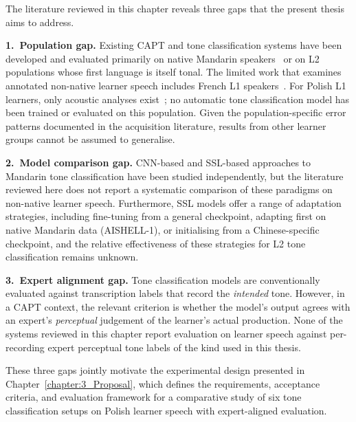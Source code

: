 The literature reviewed in this chapter reveals three gaps that the present thesis aims to address.

\textbf{1.~Population gap.} Existing CAPT and tone classification systems have been developed and evaluated primarily on native Mandarin speakers~\cite{chen2016cnn,gao2019tonenet} or on L2 populations whose first language is itself tonal. The limited work that examines annotated non-native learner speech includes French L1 speakers~\cite{hsieh2025ompal}. For Polish L1 learners, only acoustic analyses exist~\cite{chu2024statistical,zajdler2021}; no automatic tone classification model has been trained or evaluated on this population. Given the population-specific error patterns documented in the acquisition literature, results from other learner groups cannot be assumed to generalise.

\textbf{2.~Model comparison gap.} CNN-based and SSL-based approaches to Mandarin tone classification have been studied independently, but the literature reviewed here does not report a systematic comparison of these paradigms on non-native learner speech. Furthermore, SSL models offer a range of adaptation strategies, including fine-tuning from a general checkpoint, adapting first on native Mandarin data (AISHELL-1), or initialising from a Chinese-specific checkpoint, and the relative effectiveness of these strategies for L2 tone classification remains unknown.

\textbf{3.~Expert alignment gap.} Tone classification models are conventionally evaluated against transcription labels that record the \emph{intended} tone. However, in a CAPT context, the relevant criterion is whether the model's output agrees with an expert's \emph{perceptual} judgement of the learner's actual production. None of the systems reviewed in this chapter report evaluation on learner speech against per-recording expert perceptual tone labels of the kind used in this thesis.

These three gaps jointly motivate the experimental design presented in Chapter~\ref{chapter:3_Proposal}, which defines the requirements, acceptance criteria, and evaluation framework for a comparative study of six tone classification setups on Polish learner speech with expert-aligned evaluation.
